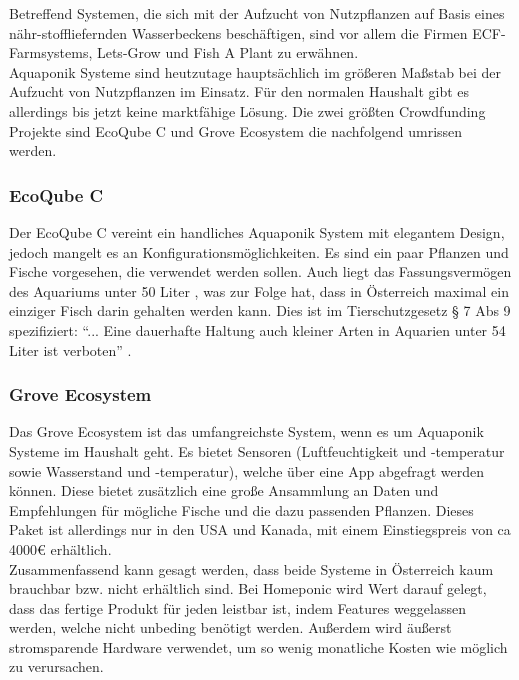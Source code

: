 \setcounter{page}{7}
Betreffend Systemen, die sich mit der Aufzucht von Nutzpflanzen auf Basis eines nähr-stoffliefernden Wasserbeckens beschäftigen, sind vor allem die Firmen ECF-Farmsystems, Lets-Grow und Fish A Plant zu erwähnen. \cite{fishAPlant, letsGrow, ECF} \\ 
Aquaponik Systeme sind heutzutage haupts\"achlich im gr\"o{\ss}eren Ma{\ss}stab bei der Aufzucht von Nutzpflanzen im Einsatz. F\"ur den normalen Haushalt gibt es allerdings bis jetzt keine marktf\"ahige L\"osung. Die zwei gr\"o{\ss}ten Crowdfunding Projekte sind EcoQube C und Grove Ecosystem die nachfolgend umrissen werden.
\subsubsection{EcoQube C}
Der EcoQube C vereint ein handliches Aquaponik System mit elegantem Design, jedoch mangelt es an Konfigurationsmöglichkeiten. Es sind ein paar Pflanzen und Fische vorgesehen, die verwendet werden sollen. Auch liegt das Fassungsverm\"ogen des Aquariums unter 50 Liter \cite{EcoQube}, was zur Folge hat, dass in \"Osterreich maximal ein einziger Fisch darin gehalten werden kann. Dies ist im Tierschutzgesetz § 7 Abs 9 spezifiziert: "`... Eine dauerhafte Haltung auch kleiner Arten in Aquarien unter 54 Liter ist verboten"' \cite{Zierfischforum, TuM}. \\
\subsubsection{Grove Ecosystem}
Das Grove Ecosystem ist das umfangreichste System, wenn es um Aquaponik Systeme im Haushalt geht. Es bietet  Sensoren (Luftfeuchtigkeit und -temperatur sowie Wasserstand und -temperatur), welche \"uber eine App abgefragt werden k\"onnen. Diese bietet zus\"atzlich eine gro{\ss}e Ansammlung an Daten und Empfehlungen f\"ur m\"ogliche Fische und die dazu passenden Pflanzen. Dieses Paket ist allerdings nur in den USA und Kanada, mit einem Einstiegspreis von ca 4000\euro \: erh\"altlich. \cite{Grove}\\
Zusammenfassend kann gesagt werden, dass beide Systeme in \"Osterreich kaum brauchbar bzw. nicht erh\"altlich sind. Bei Homeponic wird Wert darauf gelegt, dass das fertige Produkt f\"ur jeden leistbar ist, indem Features weggelassen werden, welche nicht unbeding ben\"otigt werden. Au{\ss}erdem wird \"au{\ss}erst stromsparende Hardware verwendet, um so wenig monatliche Kosten wie m\"oglich zu verursachen. \\ 
